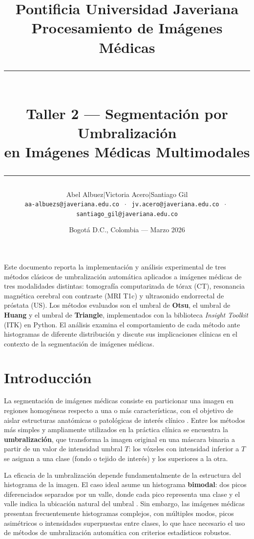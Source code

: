 \documentclass[12pt, a4paper]{article}
\title{
  \vspace{-1cm}
  {\large Pontificia Universidad Javeriana}\\[0.3em]
  {\large Procesamiento de Imágenes Médicas}\\[1em]
  \rule{\linewidth}{1.5pt}\\[0.5em]
  {\LARGE\bfseries Taller 2 — Segmentación por Umbralización\\[0.2em]
   en Imágenes Médicas Multimodales}\\[0.3em]
  \rule{\linewidth}{1.5pt}
}
\author{
  Abel Albuez\quad$\mid$\quad Victoria Acero\quad$\mid$\quad Santiago Gil\\[0.4em]
  \small\texttt{aa-albuezs@javeriana.edu.co}
  $\;\cdot\;$
  \texttt{jv.acero@javeriana.edu.co}
  $\;\cdot\;$
  \texttt{santiago\_gil@javeriana.edu.co}
}
\date{Bogotá D.C., Colombia — Marzo 2026}
\begin{document}

\maketitle
\thispagestyle{fancy}

\begin{tcolorbox}[infostyle, title={Resumen}]
Este documento reporta la implementación y análisis experimental de tres métodos clásicos
de umbralización automática aplicados a imágenes médicas de tres modalidades distintas:
tomografía computarizada de tórax (CT), resonancia magnética cerebral con contraste (MRI
T1c) y ultrasonido endorrectal de próstata (US). Los métodos evaluados son el umbral de
\textbf{Otsu}, el umbral de \textbf{Huang} y el umbral de \textbf{Triangle}, implementados
con la biblioteca \emph{Insight Toolkit} (ITK) en Python. El análisis examina el
comportamiento de cada método ante histogramas de diferente distribución y discute sus
implicaciones clínicas en el contexto de la segmentación de imágenes médicas.
\end{tcolorbox}

\vspace{0.5em}
\tableofcontents
\newpage

\section{Introducción}

La segmentación de imágenes médicas consiste en particionar una imagen en regiones
homogéneas respecto a una o más características, con el objetivo de aislar estructuras
anatómicas o patológicas de interés clínico \cite{bankman2009}. Entre los métodos más
simples y ampliamente utilizados en la práctica clínica se encuentra la
\textbf{umbralización}, que transforma la imagen original en una máscara binaria a partir
de un valor de intensidad umbral $T$: los vóxeles con intensidad inferior a $T$ se asignan
a una clase (fondo o tejido de interés) y los superiores a la otra.

La eficacia de la umbralización depende fundamentalmente de la estructura del histograma
de la imagen. El caso ideal asume un histograma \textbf{bimodal}: dos picos diferenciados
separados por un valle, donde cada pico representa una clase y el valle indica la ubicación
natural del umbral \cite{bankman2009}. Sin embargo, las imágenes médicas presentan
frecuentemente histogramas complejos, con múltiples modos, picos asimétricos o intensidades
superpuestas entre clases, lo que hace necesario el uso de métodos de umbralización
automática con criterios estadísticos robustos.
\end{document}
